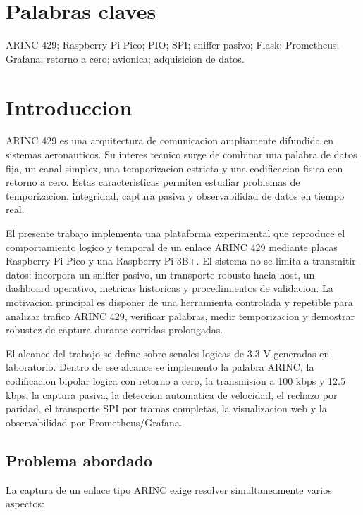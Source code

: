 \documentclass[12pt,a4paper,oneside]{report}
\begin{document}
\chapter*{Palabras claves}

ARINC 429; Raspberry Pi Pico; PIO; SPI; sniffer pasivo; Flask; Prometheus;
Grafana; retorno a cero; avionica; adquisicion de datos.


\chapter{Introduccion}

ARINC 429 es una arquitectura de comunicacion ampliamente difundida en sistemas
aeronauticos. Su interes tecnico surge de combinar una palabra de datos fija,
un canal simplex, una temporizacion estricta y una codificacion fisica con
retorno a cero. Estas caracteristicas permiten estudiar problemas de
temporizacion, integridad, captura pasiva y observabilidad de datos en tiempo
real.

El presente trabajo implementa una plataforma experimental que reproduce el
comportamiento logico y temporal de un enlace ARINC 429 mediante placas
Raspberry Pi Pico y una Raspberry Pi 3B+. El sistema no se limita a transmitir
datos: incorpora un sniffer pasivo, un transporte robusto hacia host, un
dashboard operativo, metricas historicas y procedimientos de validacion. La
motivacion principal es disponer de una herramienta controlada y repetible para
analizar trafico ARINC 429, verificar palabras, medir temporizacion y demostrar
robustez de captura durante corridas prolongadas.

El alcance del trabajo se define sobre senales logicas de 3.3 V generadas en
laboratorio. Dentro de ese alcance se implemento la palabra ARINC, la
codificacion bipolar logica con retorno a cero, la transmision a 100 kbps y
12.5 kbps, la captura pasiva, la deteccion automatica de velocidad, el rechazo
por paridad, el transporte SPI por tramas completas, la visualizacion web y la
observabilidad por Prometheus/Grafana.

\section{Problema abordado}

La captura de un enlace tipo ARINC exige resolver simultaneamente varios
aspectos:
\end{document}
